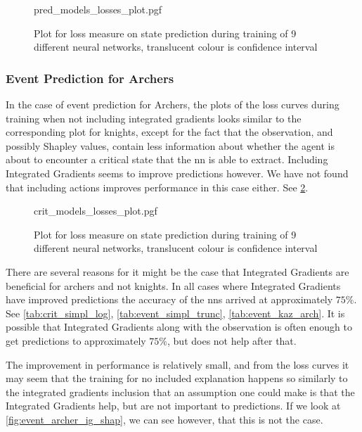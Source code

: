 \documentclass[UKenglish]{uiomasterthesis}
\begin{document}
\begin{figure}[H]
\centering
{pred_models_losses_plot.pgf}
\caption{Plot for loss measure on state prediction during training of 9 different neural networks, translucent colour is confidence interval}
\label{fig:state_knight_losses}
\end{figure}

\subsubsection{Event Prediction for Archers}

In the case of event prediction for Archers, the plots of the loss curves during training when not including integrated gradients looks similar to the corresponding plot for knights, except for the fact that the observation, and possibly Shapley values, contain less information about whether the agent is about to encounter a critical state that the \ac{nn} is able to extract. Including Integrated Gradients seems to improve predictions however. We have not found that including actions improves performance in this case either. See \cref{fig:event_archer_losses}.

\begin{figure}[H]
\centering
{crit_models_losses_plot.pgf}
\caption{Plot for loss measure on state prediction during training of 9 different neural networks, translucent colour is confidence interval}
\label{fig:event_archer_losses}
\end{figure}

There are several reasons for it might be the case that Integrated Gradients are beneficial for archers and not knights. In all cases where Integrated Gradients have improved predictions the accuracy of the \acp{nn} arrived at approximately $75\%$. See \cref{tab:crit_simpl_log}, \cref{tab:event_simpl_trunc}, \cref{tab:event_kaz_arch}. It is possible that Integrated Gradients along with the observation is often enough to get predictions to approximately $75\%$, but does not help after that.

The improvement in performance is relatively small, and from the loss curves it may seem that the training for no included explanation happens so similarly to the integrated gradients inclusion that an assumption one could make is that the Integrated Gradients help, but are not important to predictions. If we look at \cref{fig:event_archer_ig_shap}, we can see however, that this is not the case.
\end{document}
